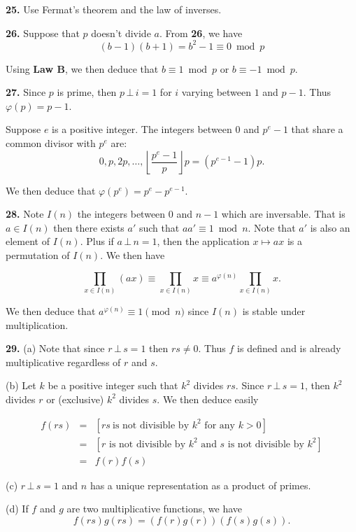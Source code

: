 \documentclass[a4paper,12pt]{article}
\newcommand{\newpar}[1]{\bigskip \noindent \textbf{#1.}}
\newcommand{\subpar}[1]{\medskip \noindent (#1)}
\begin{document}
\newpar{25} Use Fermat's theorem and the law of inverses.

\newpar{26} Suppose that $p$ doesn't divide $a$.  From \textbf{26}, we
have
\[ (b - 1)(b+1) = b^2 - 1 \equiv 0 \bmod{p}\]

Using \textbf{Law B}, we then deduce that $b \equiv 1 \bmod{p}$ or $b
\equiv -1 \bmod{p}$.

\newpar{27} Since $p$ is prime, then $p\,\bot\,i = 1$ for $i$ varying
between $1$ and $p-1$.  Thus $\varphi(p) = p-1$.

Suppose $e$ is a positive integer.  The integers between $0$ and
$p^e-1$ that share a common divisor with $p^e$ are:
\[ 0, p, 2p, \ldots, \left\lfloor \frac{p^e-1}{p}\right\rfloor p =
(p^{e-1}-1)p.\]

We then deduce that $\varphi(p^e) = p^e - p^{e-1}$.

\newpar{28} Note $I(n)$ the integers between $0$ and $n-1$ which are
inversable.  That is $a \in I(n)$ then there exists $a'$ such that
$aa' \equiv 1 \bmod{n}$.  Note that $a'$ is also an element of $I(n)$.
Plus if $a\,\bot\,n = 1$, then the application $x \mapsto ax$ is a
permutation of $I(n)$.  We then have

\[ \prod_{x \in I(n)}(ax) \equiv \prod_{x \in I(n)}x \equiv a^{\varphi(n)}
\prod_{x\in I(n)} x.\]

We then deduce that $a^{\varphi(n)} \equiv 1 \pmod{n}$ since $I(n)$ is
stable under multiplication.

\newpar{29}  \subpar{a} Note that since $r\,\bot\,s = 1$ then
$rs\not=0$. Thus $f$ is defined and is already multiplicative
regardless of $r$ and $s$.

\subpar{b} Let $k$ be a positive integer such that $k^2$ divides
$rs$.  Since $r\,\bot\,s = 1$, then $k^2$ divides $r$ or (exclusive)
$k^2$ divides $s$.  We then deduce easily

\begin{eqnarray*}
  f(rs) &=& [rs\ \mbox{is not divisible by $k^2$ for any $k>0$}] \\
  &=& [\mbox{$r$ is not divisible by $k^2$ and $s$ is not divisible by
      $k^2$}] \\
  &=& f(r)f(s)
\end{eqnarray*}

\subpar{c} $r\,\bot\,s = 1$ and $n$ has a unique representation as a
product of primes.

\subpar{d} If $f$ and $g$ are two multiplicative functions, we have
\[ f(rs)g(rs) = (f(r)g(r))(f(s)g(s)).\]
\end{document}
